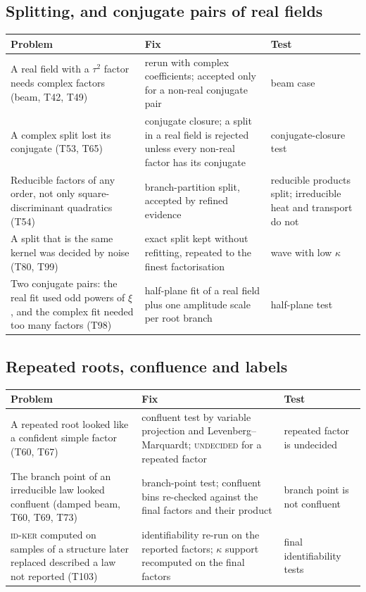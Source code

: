 \documentclass[11pt,a4paper]{article}
\theoremstyle{definition}
\begin{document}
\subsection{Splitting, and conjugate pairs of real fields}
\begin{center}\small
\begin{tabular}{@{}L{4.1cm}L{4.4cm}L{4.4cm}@{}}
\toprule
Problem & Fix & Test\\\midrule
A real field with a $\tau^2$ factor needs complex factors (beam, T42, T49) & rerun with complex coefficients; accepted only for a non-real conjugate pair & beam case\\
A complex split lost its conjugate (T53, T65) & conjugate closure; a split in a real field is rejected unless every non-real factor has its conjugate & conjugate-closure test\\
Reducible factors of any order, not only square-discriminant quadratics (T54) & branch-partition split, accepted by refined evidence & reducible products split; irreducible heat and transport do not\\
A split that is the same kernel was decided by noise (T80, T99) & exact split kept without refitting, repeated to the finest factorisation & wave with low $\kappa$\\
Two conjugate pairs: the real fit used odd powers of $\xi$, and the complex fit needed too many factors (T98) & half-plane fit of a real field plus one amplitude scale per root branch & half-plane test\\
\bottomrule
\end{tabular}
\end{center}

\subsection{Repeated roots, confluence and labels}
\begin{center}\small
\begin{tabular}{@{}L{4.1cm}L{4.4cm}L{4.4cm}@{}}
\toprule
Problem & Fix & Test\\\midrule
A repeated root looked like a confident simple factor (T60, T67) & confluent test by variable projection and Levenberg--Marquardt; \textsc{undecided} for a repeated factor & repeated factor is undecided\\
The branch point of an irreducible law looked confluent (damped beam, T60, T69, T73) & branch-point test; confluent bins re-checked against the final factors and their product & branch point is not confluent\\
\textsc{id-ker} computed on samples of a structure later replaced described a law not reported (T103) & identifiability re-run on the reported factors; $\kappa$ support recomputed on the final factors & final identifiability tests\\
\bottomrule
\end{tabular}
\end{center}
\end{document}
